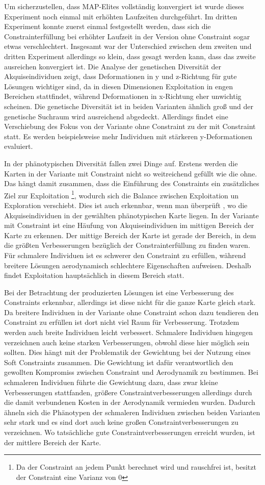 Um sicherzustellen, dass MAP-Elites vollständig konvergiert ist wurde dieses Experiment noch einmal mit erhöhten Laufzeiten durchgeführt.
Im dritten Experiment konnte zuerst einmal festgestellt werden, dass sich die Constrainterfüllung bei erhöhter Laufzeit in der Version ohne Constraint sogar etwas verschlechtert.
Insgesamt war der Unterschied zwischen dem zweiten und dritten Experiment allerdings so klein, dass gesagt werden kann, dass das zweite ausreichen konvergiert ist.
Die Analyse der genetischen Diversität der Akquiseindividuen zeigt, dass Deformationen in y und z-Richtung für gute Lösungen wichtiger sind, da in diesen Dimensionen Exploitation in engen Bereichen stattfindet, während Deformationen in x-Richtung eher unwichtig scheinen.
Die genetische Diversität ist in beiden Varianten ähnlich groß und der genetische Suchraum wird ausreichend abgedeckt.
Allerdings findet eine Verschiebung des Fokus von der Variante ohne Constraint zu der mit Constraint statt.
Es werden beispielsweise mehr Individuen mit stärkeren y-Deformationen evaluiert.

In der phänotypischen Diversität fallen zwei Dinge auf.
Erstens werden die Karten in der Variante mit Constraint nicht so weitreichend gefüllt wie die ohne.
Das hängt damit zusammen, dass die Einführung des Constraints ein zusätzliches Ziel zur Exploitation
\footnote{Da der Constraint an jedem Punkt berechnet wird und rauschfrei ist, besitzt der Constraint eine Varianz von 0}, wodurch sich die Balance zwischen Exploitation un Exploration verschiebt.
Dies ist auch erkennbar, wenn man überprüft , wo die Akquiseindividuen in der gewählten phänotypischen Karte liegen.
In der Variante mit Constraint ist eine Häufung von Akquiseindividuen im mittigen Bereich der Karte zu erkennen.
Der mittige Bereich der Karte ist gerade der Bereich, in dem die größten Verbesserungen bezüglich der Constrainterfüllung zu finden waren.
Für schmalere Individuen ist es schwerer den Constraint zu erfüllen, während breitere Lösungen aerodynamisch schlechtere Eigenschaften aufweisen.
Deshalb findet Exploitation hauptsächlich in diesem Bereich statt.

Bei der Betrachtung der produzierten Lösungen ist eine Verbesserung des Constraints erkennbar, allerdings ist diese nicht für die ganze Karte gleich stark.
Da breitere Individuen in der Variante ohne Constraint schon dazu tendieren den Constraint zu erfüllen ist dort nicht viel Raum für Verbesserung.
Trotzdem werden auch breite Individuen leicht verbessert.
Schmalere Individuen hingegen verzeichnen auch keine starken Verbesserungen, obwohl diese hier möglich sein sollten.
Dies hängt mit der Problematik der Gewichtung bei der Nutzung eines Soft Constraints zusammen.
Die Gewichtung ist dafür verantwortlich den gewollten Kompromiss zwischen Constraint und Aerodynamik zu bestimmen.
Bei schmaleren Individuen führte die Gewichtung dazu, dass zwar kleine Verbesserungen stattfanden, größere Constraintverbesserungen allerdings durch die damit verbundenen Kosten in der Aerodynamik vermieden wurden.
Dadurch ähneln sich die Phänotypen der schmaleren Individuen zwischen beiden Varianten sehr stark und es sind dort auch keine großen Constraintverbesserungen zu verzeichnen.
Wo tatsächliche gute Constraintverbesserungen erreicht wurden, ist der mittlere Bereich der Karte.

